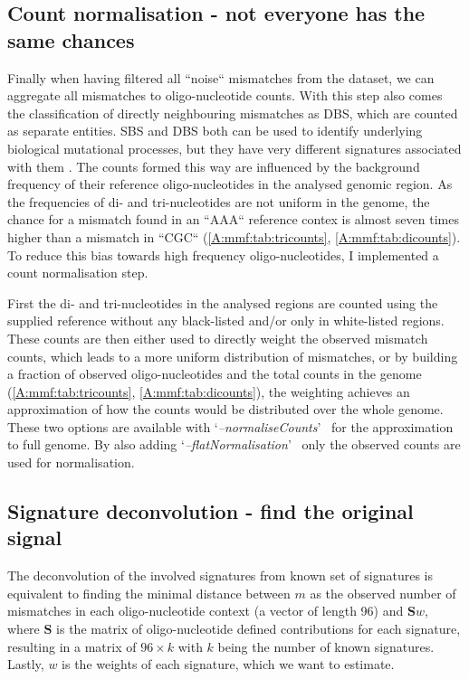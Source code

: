 \subsection[Count normalisation]{Count normalisation - not everyone has the same chances}
\label{mmf-sec:countNorm}
Finally when having filtered all ``noise`` mismatches from the dataset, we can aggregate all mismatches to oligo-nucleotide counts. With this step also comes the classification of 
directly neighbouring mismatches as DBS, which are counted as separate entities. SBS and DBS both can be used to identify underlying biological mutational processes, but they have very different signatures associated with them \cite{Alexandrov2020}. The counts formed this way are influenced by the background frequency of their reference oligo-nucleotides in the analysed genomic region. As the frequencies of di- and tri-nucleotides are not uniform in the genome, the chance for a mismatch found in an ``AAA`` reference contex is almost seven times higher than a mismatch in ``CGC`` (\autoref{A:mmf:tab:tricounts}, \autoref{A:mmf:tab:dicounts}). To reduce this bias towards high frequency oligo-nucleotides, I implemented a count normalisation step.

First the di- and tri-nucleotides in the analysed regions are counted using the supplied reference without any black-listed and/or only in white-listed regions. These counts are then either used to directly weight the observed mismatch counts, which leads to a more uniform distribution of mismatches, or by building a fraction of observed oligo-nucleotides and the total counts in the genome (\autoref{A:mmf:tab:tricounts}, \autoref{A:mmf:tab:dicounts}), the weighting achieves an approximation of how the counts would be distributed over the whole genome. These two options are available with \lq\emph{--normaliseCounts}\rq~ for the approximation to full genome. By also adding \lq\emph{--flatNormalisation}\rq~ only the observed counts are used for normalisation.

\subsection[Signature deconvolution]{Signature deconvolution - find the original signal}
\label{mmf-sec:sigDeconv}
The deconvolution of the involved signatures from known set of signatures is equivalent to finding the minimal distance between $m$ as the observed number of mismatches in each oligo-nucleotide context (a vector of length 96) and $\textbf{S}w$, where $\textbf{S}$ is the matrix of oligo-nucleotide defined contributions for each signature, resulting in a matrix of $96 \times k$ with $k$ being the number of known signatures. Lastly, $w$ is the weights of each signature, which we want to estimate. 

